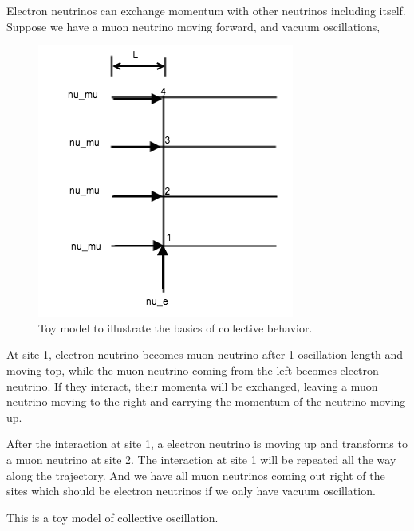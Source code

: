 \documentclass[letterpaper,12pt,english]{sphinxmanual}
\begin{document}
Electron neutrinos can exchange momentum with other neutrinos including itself. Suppose we have a muon neutrino moving forward, and vacuum oscillations,
\begin{figure}[htbp]
\centering
\capstart

\includegraphics{collectiveToyModel.png}
\caption{Toy model to illustrate the basics of collective behavior.}\end{figure}

At site 1, electron neutrino becomes muon neutrino after 1 oscillation length and moving top, while the muon neutrino coming from the left becomes electron neutrino. If they interact, their momenta will be exchanged, leaving a muon neutrino moving to the right and carrying the momentum of the neutrino moving up.

After the interaction at site 1, a electron neutrino is moving up and transforms to a muon neutrino at site 2. The interaction at site 1 will be repeated all the way along the trajectory. And we have all muon neutrinos coming out right of the sites which should be electron neutrinos if we only have vacuum oscillation.

This is a toy model of collective oscillation.

\end{document}
